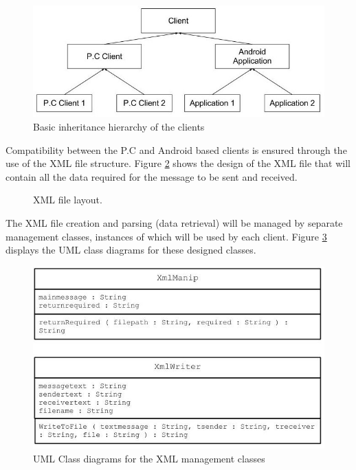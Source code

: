 \documentclass[a4paper,12pt]{report}
\begin{document}
\begin{figure}[htb]
\centering
\includegraphics[scale=0.4]{images/designs2.jpg}
\caption{Basic inheritance hierarchy of the clients}
\label{fig:clienthier}
\end{figure}

Compatibility between the P.C and Android based clients is ensured through the use of the XML file structure. Figure \ref{fig:xmldesign} shows the design of the XML file that will contain all the data required for the message to be sent and received.  

\begin{figure}[htb]
\centering

\caption{XML file layout.}
\label{fig:xmldesign}
\end{figure}

The XML file creation and parsing (data retrieval) will be managed by separate management classes, instances of which will be used by each client. Figure \ref{fig:xmlclass} displays the UML class diagrams for these designed classes.

\begin{figure}[htb]
\centering
\includegraphics[scale=0.4]{images/xmlclass.jpg}
\caption{UML Class diagrams for the XML management classes}
\label{fig:xmlclass}
\end{figure}
\end{document}
